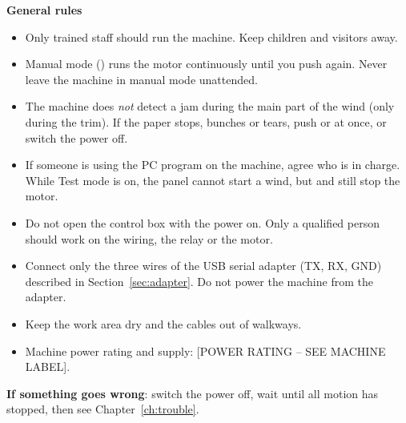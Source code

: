 \textbf{General rules}
\begin{itemize}
  \item Only trained staff should run the machine. Keep children and visitors away.
  \item Manual mode () runs the motor continuously until you push
         again. Never leave the machine in manual mode unattended.
  \item The machine does \emph{not} detect a jam during the main part of the
        wind (only during the trim). If the paper stops, bunches or tears,
        push  or  at once, or switch the power off.
  \item If someone is using the PC program on the machine, agree who is in
        charge. While Test mode is on, the panel cannot start a wind, but
         and  still stop the motor.
  \item Do not open the control box with the power on. Only a qualified person
        should work on the wiring, the relay or the motor.
  \item Connect only the three wires of the USB serial adapter (TX, RX, GND)
        described in Section~\ref{sec:adapter}. Do not power the machine from
        the adapter.
  \item Keep the work area dry and the cables out of walkways.
  \item Machine power rating and supply: [POWER RATING -- SEE MACHINE LABEL].
\end{itemize}

\textbf{If something goes wrong}: switch the power off, wait until all
motion has stopped, then see Chapter~\ref{ch:trouble}.
